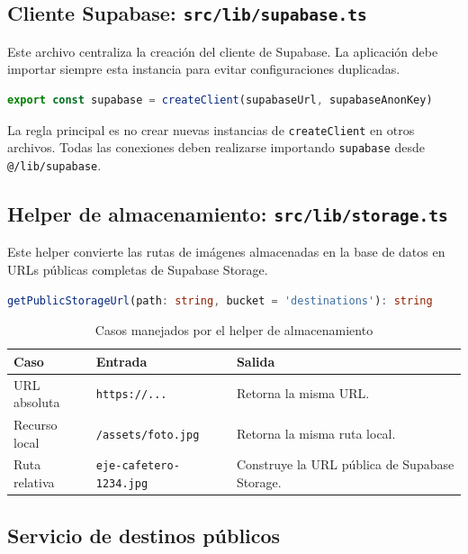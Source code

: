 \documentclass[12pt,letterpaper]{article}
\newcommand{\code}[1]{\nolinkurl{#1}}
\begin{document}
\subsection{\texorpdfstring{Cliente Supabase: \code{src/lib/supabase.ts}}{Cliente Supabase: src/lib/supabase.ts}}

Este archivo centraliza la creación del cliente de Supabase. La aplicación debe importar siempre esta instancia para evitar configuraciones duplicadas.

\begin{lstlisting}[language=typescript]
export const supabase = createClient(supabaseUrl, supabaseAnonKey)
\end{lstlisting}

La regla principal es no crear nuevas instancias de \code{createClient} en otros archivos. Todas las conexiones deben realizarse importando \code{supabase} desde \code{@/lib/supabase}.

\subsection{\texorpdfstring{Helper de almacenamiento: \code{src/lib/storage.ts}}{Helper de almacenamiento: src/lib/storage.ts}}

Este helper convierte las rutas de imágenes almacenadas en la base de datos en URLs públicas completas de Supabase Storage.

\begin{lstlisting}[language=typescript]
getPublicStorageUrl(path: string, bucket = 'destinations'): string
\end{lstlisting}

\begin{longtable}{|p{}|p{}|p{}|}
\caption{Casos manejados por el helper de almacenamiento}\\
\hline
\textbf{Caso} & \textbf{Entrada} & \textbf{Salida} \\
\hline
URL absoluta & \code{https://...} & Retorna la misma URL. \\
\hline
Recurso local & \code{/assets/foto.jpg} & Retorna la misma ruta local. \\
\hline
Ruta relativa & \code{eje-cafetero-1234.jpg} & Construye la URL pública de Supabase Storage. \\
\hline
\end{longtable}

\subsection{Servicio de destinos públicos}
\end{document}
